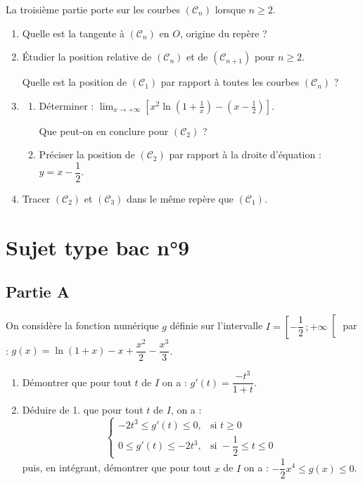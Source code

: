 La troisième partie porte sur les courbes $(\mathscr{C}_n)$ lorsque $n \geqslant 2$.

\begin{enumerate}
	\item Quelle est la tangente à $(\mathscr{C}_n)$ en $O$, origine du repère ?
	\item Étudier la position relative de $(\mathscr{C}_n)$ et de $(\mathscr{C}_{n+1})$ pour $n \geqslant 2$.

	Quelle est la position de $(\mathscr{C}_1)$ par rapport à toutes les courbes $(\mathscr{C}_n)$ ?
	\item
	\begin{enumerate}
		\item Déterminer : $\displaystyle\lim_{x\to+\infty}\left[x^2\ln\!\left(1+\frac1x\right) - \left(x-\frac12\right)\right]$.

		Que peut-on en conclure pour $(\mathscr{C}_2)$ ?
		\item Préciser la position de $(\mathscr{C}_2)$ par rapport à la droite d'équation : $y = x - \dfrac12$.
	\end{enumerate}
	\item Tracer $(\mathscr{C}_2)$ et $(\mathscr{C}_3)$ dans le même repère que $(\mathscr{C}_1)$.
\end{enumerate}


\section*{Sujet type bac n°9}

\subsection*{Partie A}

On considère la fonction numérique $g$ définie sur l'intervalle $I=\left[-\dfrac12\,;+\infty\right[$ par : $g(x) = \ln(1+x) - x + \dfrac{x^2}{2} - \dfrac{x^3}{3}$.

\begin{enumerate}
	\item Démontrer que pour tout $t$ de $I$ on a : $g'(t) = \dfrac{-t^3}{1+t}$.
	\item Déduire de 1. que pour tout $t$ de $I$, on a :
	\[
	\begin{cases}
		-2t^3 \leqslant g'(t) \leqslant 0, & \text{si } t \geqslant 0 \\
		0 \leqslant g'(t) \leqslant -2t^3, & \text{si } -\dfrac12 \leqslant t \leqslant 0
	\end{cases}
	\]
	puis, en intégrant, démontrer que pour tout $x$ de $I$ on a : $-\dfrac12 x^4 \leqslant g(x) \leqslant 0$.
\end{enumerate}

